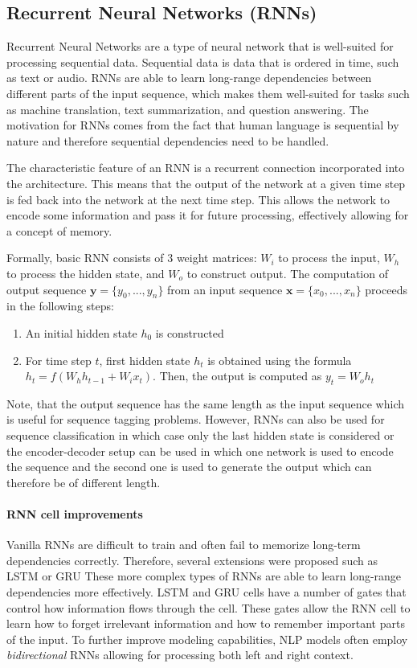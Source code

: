 \subsection{Recurrent Neural Networks (RNNs)}
\label{background:rnns}
Recurrent Neural Networks are a type of neural network that is well-suited for processing sequential data\cite{GoodBengCour16}. Sequential data is data that is ordered in time, such as text or audio.
RNNs are able to learn long-range dependencies between different parts of the input sequence, which makes them well-suited for tasks such as machine translation, text summarization, and question answering.
The motivation for RNNs comes from the fact that human language is sequential by nature and therefore sequential dependencies need to be handled.

The characteristic feature of an RNN is a recurrent connection incorporated into the architecture.
This means that the output of the network at a given time step is fed back into the network at the next time step. This allows the network to encode some information and pass it for future processing, effectively allowing for a concept of memory.

Formally, basic RNN consists of 3 weight matrices: $W_{i}$ to process the input, $W_h$ to process the hidden state, and $W_o$ to construct output.
The computation of output sequence $\mathbf{y} = \{y_0, ..., y_n\}$ from an input sequence $\mathbf{x} = \{x_0, ..., x_n\}$ proceeds in the following steps:
\begin{enumerate}
    \item An initial hidden state $h_0$ is constructed
    \item For time step $t$, first hidden state $h_t$ is obtained using the formula $h_t = f(W_hh_{t-1} + W_ix_t)$. Then, the output is computed as $y_t = W_oh_t$
\end{enumerate}
Note, that the output sequence has the same length as the input sequence which is useful for sequence tagging problems.
However, RNNs can also be used for sequence classification in which case only the last hidden state is considered or the encoder-decoder setup can be used in which one network is used to encode the sequence and the second one is used to generate the output which can therefore be of different length.

\paragraph{RNN cell improvements}
Vanilla RNNs are difficult to train and often fail to memorize long-term dependencies correctly.
Therefore, several extensions were proposed such as LSTM \cite{hochreiter1997} or GRU \cite{cho-etal-2014-properties}
These more complex types of RNNs are able to learn long-range dependencies more effectively.
LSTM and GRU cells have a number of gates that control how information flows through the cell.
These gates allow the RNN cell to learn how to forget irrelevant information and how to remember important parts of the input.
To further improve modeling capabilities, NLP models often employ \emph{bidirectional} RNNs allowing for processing both left and right context.

